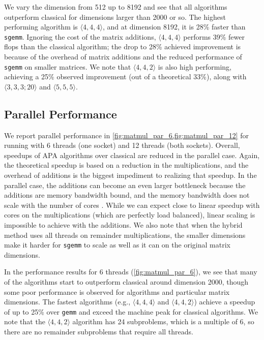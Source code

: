 \documentclass[conference]{IEEEtran}
\newcommand{\dims}[1]{\langle #1 \rangle}
\begin{document}
We vary the dimension from 512 up to 8192 and see that all algorithms outperform classical for dimensions larger than 2000 or so.
The highest performing algorithm is $\dims{4,4,4}$, and at dimension 8192, it is 28\% faster than \texttt{sgemm}.
Ignoring the cost of the matrix additions, $\dims{4,4,4}$ performs 39\% fewer flops than the classical algorithm; the drop to 28\% achieved improvement is because of the overhead of matrix additions and the reduced performance of \texttt{sgemm} on smaller matrices.
We note that $\dims{4,4,2}$ is also high performing, achieving a 25\% observed improvement (out of a theoretical 33\%), along with $\dims{3,3,3;20}$ and $\dims{5,5,5}$.

\subsection{Parallel Performance}
\label{sec:matmul_perf_par}

We report parallel performance in \cref{fig:matmul_par_6,fig:matmul_par_12} for running with 6 threads (one socket) and 12 threads (both sockets).
Overall, speedups of APA algorithms over classical are reduced in the parallel case.
Again, the theoretical speedup is based on a reduction in the multiplications, and the overhead of additions is the biggest impediment to realizing that speedup.
In the parallel case, the additions can become an even larger bottleneck because the additions are memory bandwidth bound, and the memory bandwidth does not scale with the number of cores \cite{BB15}.
While we can expect close to linear speedup with cores on the multiplications (which are perfectly load balanced), linear scaling is impossible to achieve with the additions.
We also note that when the hybrid method uses all threads on remainder multiplications, the smaller dimensions make it harder for \texttt{sgemm} to scale as well as it can on the original matrix dimensions.

In the performance results for 6 threads (\cref{fig:matmul_par_6}), we see that many of the algorithms start to outperform classical around dimension 2000, though some poor performance is observed for algorithms and particular matrix dimensions.
The fastest algorithms (e.g., $\dims{4,4,4}$ and $\dims{4,4,2}$) achieve a speedup of up to 25\% over \texttt{gemm} and exceed the machine peak for classical algorithms.
We note that the $\dims{4,4,2}$ algorithm has 24 subproblems, which is a multiple of 6, so there are no remainder subproblems that require all threads.
\end{document}
